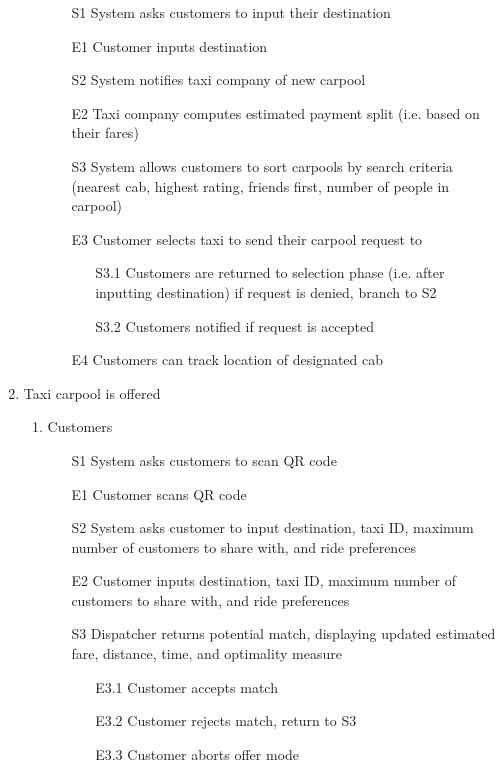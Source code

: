 \documentclass[]{article}
\begin{document}
\begin{enumerate}[{BE}1.]
\begin{enumerate}[{VP3}.1]
			\begin{enumerate}
				\item[S1] System asks customers to input their destination
				\item[E1] Customer inputs destination
				\item[S2] System notifies taxi company of new carpool
				\item[E2] Taxi company computes estimated payment split (i.e. based on their fares)
				\item[S3] System allows customers to sort carpools by search criteria (nearest cab, highest rating, friends first, number of people in carpool)
				\item[E3] Customer selects taxi to send their carpool request to
				\begin{enumerate}
					\item[S3.1] Customers are returned to selection phase (i.e. after inputting destination) if request is denied, branch to S2
					\item[S3.2] Customers notified if request is accepted
				\end{enumerate}
				\item[E4] Customers can track location of designated cab
			\end{enumerate}
	\end{enumerate}
	\item Taxi carpool is offered
	\begin{enumerate}[{VP4}.1]
		\item Customers
			\begin{enumerate}
				\item[S1] System asks customers to scan QR code
				\item[E1] Customer scans QR code
				\item[S2] System asks customer to input destination, taxi ID, maximum number of customers to share with, and ride preferences
				\item[E2] Customer inputs destination, taxi ID, maximum number of customers to share with, and ride preferences
				\item[S3] Dispatcher returns potential match, displaying updated estimated fare, distance, time, and optimality measure
				\begin{enumerate}
					\item[E3.1] Customer accepts match
					\item[E3.2] Customer rejects match, return to S3
					\item[E3.3] Customer aborts offer mode

\end{enumerate}
\end{enumerate}
\end{enumerate}
\end{enumerate}
\end{document}
